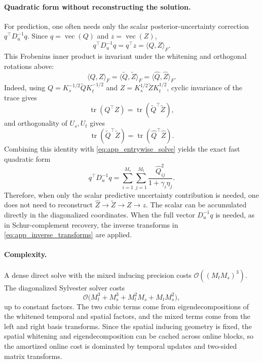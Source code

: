 \documentclass[12pt]{article}
\newcommand{\tr}{\operatorname{tr}}
\newcommand{\vecop}{\operatorname{vec}}
\begin{document}
\paragraph{Quadratic form without reconstructing the solution.}
For prediction, one often needs only the scalar posterior-uncertainty correction
\(q^\top D_u^{-1}q\).  Since \(q=\vecop(Q)\) and \(z=\vecop(Z)\),
\begin{equation}
    q^\top D_u^{-1}q=q^\top z=\langle Q,Z\rangle_F.
    \label{eq:app_qform_matrix_inner}
\end{equation}
This Frobenius inner product is invariant under the whitening and orthogonal
rotations above:
\begin{equation}
    \langle Q,Z\rangle_F
    =\langle \widetilde Q,\widetilde Z\rangle_F
    =\langle \widehat Q,\widehat Z\rangle_F.
    \label{eq:app_inner_invariance}
\end{equation}
Indeed, using \(Q=K_s^{-1/2}\widetilde QK_t^{-1/2}\) and
\(Z=K_s^{1/2}\widetilde ZK_t^{1/2}\), cyclic invariance of the trace gives
\begin{equation}
    \tr(Q^\top Z)
    =\tr(\widetilde Q^\top \widetilde Z),
\end{equation}
and orthogonality of \(U_s,U_t\) gives
\begin{equation}
    \tr(\widetilde Q^\top\widetilde Z)
    =\tr(\widehat Q^\top\widehat Z).
\end{equation}
Combining this identity with \eqref{eq:app_entrywise_solve} yields the exact
fast quadratic form
\begin{equation}
    q^\top D_u^{-1}q
    =
    \sum_{i=1}^{M_s}\sum_{j=1}^{M_t}
    \frac{\widehat Q_{ij}^{2}}{1+\gamma_i\eta_j}.
    \label{eq:app_fast_quadratic_form}
\end{equation}
Therefore, when only the scalar predictive uncertainty contribution is needed,
one does not need to reconstruct \(\widehat Z\to\widetilde Z\to Z\to z\).  The
scalar can be accumulated directly in the diagonalized coordinates.  When the
full vector \(D_u^{-1}q\) is needed, as in Schur-complement recovery, the inverse
transforms in \eqref{eq:app_inverse_transforms} are applied.

\paragraph{Complexity.}
A dense direct solve with the mixed inducing precision costs
\(\mathcal{O}((M_tM_s)^3)\).  The diagonalized Sylvester solver costs
\begin{equation}
    \mathcal{O}\!\big(M_t^3+M_s^3+M_t^2M_s+M_tM_s^2\big),
    \label{eq:app_sylvester_complexity}
\end{equation}
up to constant factors.  The two cubic terms come from eigendecompositions of
the whitened temporal and spatial factors, and the mixed terms come from the
left and right basis transforms.  Since the spatial inducing geometry is fixed,
the spatial whitening and eigendecomposition can be cached across online blocks,
so the amortized online cost is dominated by temporal updates and two-sided
matrix transforms.
\end{document}

